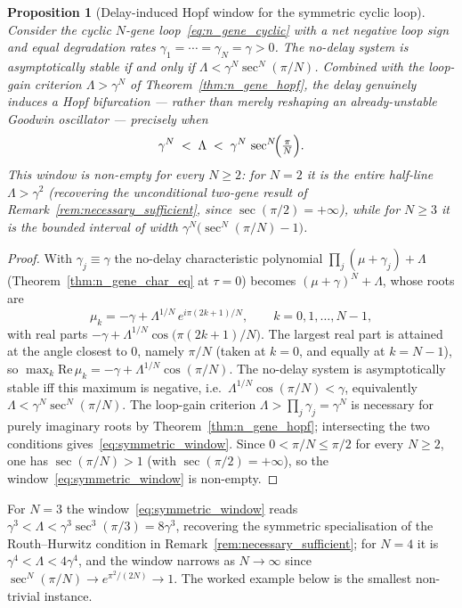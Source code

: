 \documentclass[sn-mathphys,Numbered]{sn-jnl}
\theoremstyle{thmstyleone}
\newtheorem{proposition}[theorem]{Proposition}
\theoremstyle{thmstyletwo}
\theoremstyle{thmstylethree}
\begin{document}
\begin{proposition}[Delay-induced Hopf window for the symmetric cyclic loop]
\label{prop:symmetric_window}
Consider the cyclic $N$-gene loop~\eqref{eq:n_gene_cyclic} with a net
negative loop sign and equal degradation rates
$\gamma_1=\cdots=\gamma_N=\gamma>0$. The no-delay system is
asymptotically stable if and only if
$\Lambda<\gamma^{N}\sec^{N}(\pi/N)$. Combined with the loop-gain
criterion $\Lambda>\gamma^{N}$ of Theorem~\ref{thm:n_gene_hopf}, the
delay genuinely \emph{induces} a Hopf bifurcation --- rather than merely
reshaping an already-unstable Goodwin oscillator --- precisely when
\begin{equation}
\gamma^{N}\;<\;\Lambda\;<\;\gamma^{N}\,\sec^{N}\!\Bigl(\tfrac{\pi}{N}\Bigr).
\label{eq:symmetric_window}
\end{equation}
This window is non-empty for every $N\geq2$: for $N=2$ it is the entire
half-line $\Lambda>\gamma^{2}$ (recovering the unconditional two-gene
result of Remark~\ref{rem:necessary_sufficient}, since
$\sec(\pi/2)=+\infty$), while for $N\geq3$ it is the bounded interval
of width $\gamma^{N}\bigl(\sec^{N}(\pi/N)-1\bigr)$.
\end{proposition}
\begin{proof}
With $\gamma_j\equiv\gamma$ the no-delay characteristic polynomial
$\prod_j(\mu+\gamma_j)+\Lambda$ (Theorem~\ref{thm:n_gene_char_eq} at
$\tau=0$) becomes $(\mu+\gamma)^{N}+\Lambda$, whose roots are
\[
\mu_k=-\gamma+\Lambda^{1/N}\,e^{i\pi(2k+1)/N},
\qquad k=0,1,\ldots,N-1,
\]
with real parts
$-\gamma+\Lambda^{1/N}\cos\bigl(\pi(2k+1)/N\bigr)$. The largest real
part is attained at the angle closest to $0$, namely $\pi/N$ (taken at
$k=0$, and equally at $k=N-1$), so
$\max_k\mathrm{Re}\,\mu_k=-\gamma+\Lambda^{1/N}\cos(\pi/N)$. The
no-delay system is asymptotically stable iff this maximum is negative,
i.e.\ $\Lambda^{1/N}\cos(\pi/N)<\gamma$, equivalently
$\Lambda<\gamma^{N}\sec^{N}(\pi/N)$. The loop-gain criterion
$\Lambda>\prod_j\gamma_j=\gamma^{N}$ is necessary for purely imaginary
roots by Theorem~\ref{thm:n_gene_hopf}; intersecting the two conditions
gives~\eqref{eq:symmetric_window}. Since $0<\pi/N\leq\pi/2$ for every
$N\geq2$, one has $\sec(\pi/N)>1$ (with $\sec(\pi/2)=+\infty$), so the
window~\eqref{eq:symmetric_window} is non-empty.
\end{proof}

For $N=3$ the window~\eqref{eq:symmetric_window} reads
$\gamma^{3}<\Lambda<\gamma^{3}\sec^{3}(\pi/3)=8\gamma^{3}$, recovering
the symmetric specialisation of the Routh--Hurwitz condition in
Remark~\ref{rem:necessary_sufficient}; for $N=4$ it is
$\gamma^{4}<\Lambda<4\gamma^{4}$, and the window narrows as
$N\to\infty$ since $\sec^{N}(\pi/N)\to e^{\pi^{2}/(2N)}\to1$. The
worked example below is the smallest non-trivial instance.
\end{document}
